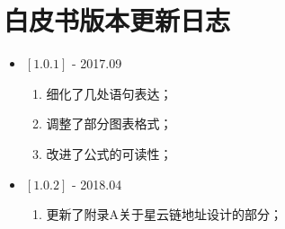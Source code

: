 \section{白皮书版本更新日志}
\begin{itemize}
\item $[1.0.1]$ - 2017.09
\begin{enumerate}
\item 细化了几处语句表达；
\item 调整了部分图表格式；
\item 改进了公式的可读性；
\end{enumerate}

\item $[1.0.2]$ - 2018.04
\begin{enumerate}
\item 更新了附录A关于星云链地址设计的部分；
\end{enumerate}

\end{itemize}
